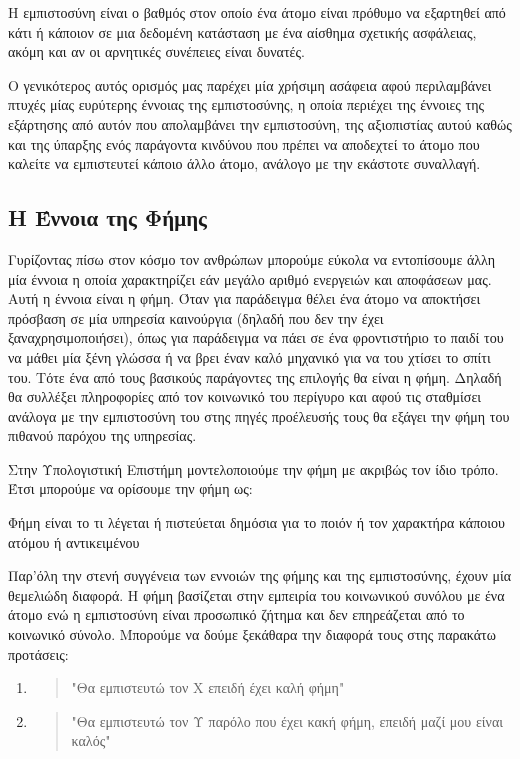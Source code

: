 \begin{decision}
Η εμπιστοσύνη είναι ο βαθμός στον οποίο ένα άτομο είναι πρόθυμο να εξαρτηθεί από κάτι ή κάποιον σε μια δεδομένη κατάσταση με ένα αίσθημα σχετικής ασφάλειας, ακόμη και αν οι αρνητικές συνέπειες είναι δυνατές.
\end{decision}

Ο γενικότερος αυτός ορισμός μας παρέχει μία χρήσιμη ασάφεια αφού περιλαμβάνει πτυχές μίας ευρύτερης έννοιας της εμπιστοσύνης, η οποία περιέχει της έννοιες της εξάρτησης από αυτόν που απολαμβάνει την εμπιστοσύνη, της αξιοπιστίας αυτού καθώς και της ύπαρξης ενός παράγοντα κινδύνου που πρέπει να αποδεχτεί το άτομο που καλείτε να εμπιστευτεί κάποιο άλλο άτομο, ανάλογο με την εκάστοτε συναλλαγή.

\subsection{Η Έννοια της Φήμης}\label{sec:rep}

Γυρίζοντας πίσω στον κόσμο τον ανθρώπων μπορούμε εύκολα να εντοπίσουμε άλλη μία έννοια η οποία χαρακτηρίζει εάν μεγάλο αριθμό ενεργειών και αποφάσεων μας. Αυτή η έννοια είναι η φήμη. Όταν για παράδειγμα θέλει ένα άτομο να αποκτήσει πρόσβαση σε μία υπηρεσία καινούργια (δηλαδή που δεν την έχει ξαναχρησιμοποιήσει), όπως για παράδειγμα να πάει σε ένα φροντιστήριο το παιδί του να μάθει μία ξένη γλώσσα ή να βρει έναν καλό μηχανικό για να του χτίσει το σπίτι του. Τότε ένα από τους βασικούς παράγοντες της επιλογής θα είναι η φήμη. Δηλαδή θα συλλέξει πληροφορίες από τον κοινωνικό του περίγυρο και αφού τις σταθμίσει ανάλογα με την εμπιστοσύνη του στης πηγές προέλευσής τους θα εξάγει την φήμη του πιθανού παρόχου της υπηρεσίας.
\newpage

Στην Υπολογιστική Επιστήμη μοντελοποιούμε την φήμη με ακριβώς τον ίδιο τρόπο. Έτσι μπορούμε να ορίσουμε την φήμη ως:
\begin{reputation}
Φήμη είναι το τι λέγεται ή πιστεύεται δημόσια για το ποιόν ή τον χαρακτήρα κάποιου ατόμου ή αντικειμένου
\end{reputation}

Παρ'όλη την στενή συγγένεια των εννοιών της φήμης και της εμπιστοσύνης, έχουν μία θεμελιώδη διαφορά. Η φήμη βασίζεται στην εμπειρία του κοινωνικού συνόλου με ένα άτομο ενώ η εμπιστοσύνη είναι προσωπικό ζήτημα και δεν επηρεάζεται από το κοινωνικό σύνολο. Μπορούμε να δούμε ξεκάθαρα την διαφορά τους στης παρακάτω προτάσεις:
\begin{enumerate}
\item \begin{quote} 
"Θα εμπιστευτώ τον Χ επειδή έχει καλή φήμη"
\end{quote}
\item \begin{quote}
 "Θα εμπιστευτώ τον Υ παρόλο που έχει κακή φήμη, επειδή μαζί μου είναι καλός"
\end{quote}
\end{enumerate}


